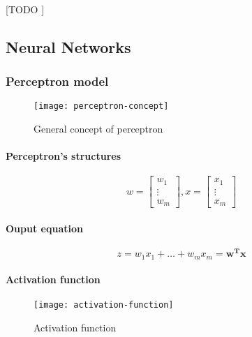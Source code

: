 \documentclass{article}
\begin{document}
				\paragraph{}
				[TODO ]


		\subsection{Neural Networks}
		\label{sec:neural-networks}

			\subsubsection{Perceptron model}

			\begin{figure}
				\centering
				\texttt{[image: perceptron-concept]}
				\caption{General concept of perceptron}
				\label{fig:perceptron-concept}
			\end{figure}

			\paragraph{Perceptron's structures}
			\begin{equation*}
				w = \begin{bmatrix}
						w_1 \\
						\vdots \\
						w_m
					\end{bmatrix}, x =
					\begin{bmatrix}
						x_1 \\
						\vdots \\
						x_m
					\end{bmatrix}
			\end{equation*}

			\paragraph{Ouput equation}
			\begin{equation*}
				z = w_1 x_1 + \dots + w_m x_m = \boldsymbol{w^T x}
			\end{equation*}


			\paragraph{Activation function}

			\begin{figure}
				\centering
				\texttt{[image: activation-function]}
				\caption{Activation function}
				\label{fig:activation-function}
			\end{figure}
\end{document}
